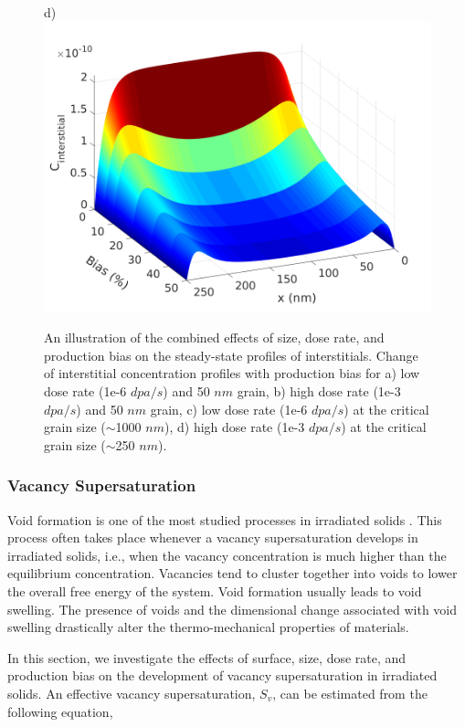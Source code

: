 \documentclass[utf8]{frontiersSCNS} %
\begin{document}
\begin{figure}[htb!]
        \qquad
        d)\includegraphics[scale=0.3]{Fig6_d}
        \caption{An illustration of the combined effects of size, dose rate, and production bias on the steady-state profiles of interstitials. Change of interstitial concentration profiles with production bias for a) low dose rate (1e-6 $dpa/s$) and 50 $nm$ grain, b) high dose rate (1e-3 $dpa/s$) and 50 $nm$ grain, c) low dose rate (1e-6 $dpa/s$) at the critical grain size (${\sim}$1000 $nm$), d) high dose rate (1e-3 $dpa/s$) at the critical grain size (${\sim}$250 $nm$).}
        \label{figure:3D_concentrations_neutron_1e-6}
    \end{figure}

\newpage
\subsubsection{Vacancy Supersaturation}

    Void formation is one of the most studied processes in irradiated solids \cite{was2017,noble2020,ghoniem2001,krishnanOct1980,gao2018}. This process often takes place whenever a vacancy supersaturation develops in irradiated solids, i.e., when the vacancy concentration is much higher than the equilibrium concentration. Vacancies tend to cluster together into voids to lower the overall free energy of the system. Void formation usually leads to void swelling. The presence of voids and the dimensional change associated with void swelling drastically alter the thermo-mechanical properties of materials.  
    
    In this section, we investigate the effects of surface, size, dose rate, and production bias on the development of vacancy supersaturation in irradiated solids. An effective vacancy supersaturation, $S_v$, can be estimated from the following equation, \citep{was2017}
\end{document}
